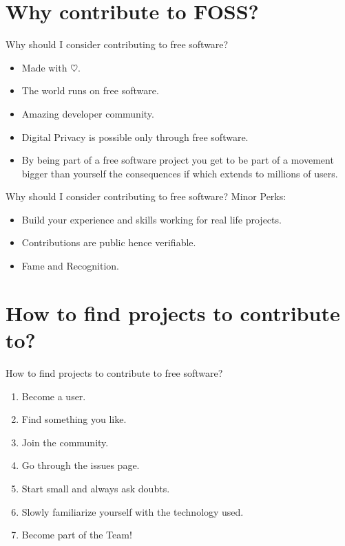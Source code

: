\documentclass[presentation]{beamer}
\begin{document}
\section*{Why contribute to FOSS?}
\label{sec:org112b715}
\begin{frame}[label={sec:orgeff411d}]{Why should I consider contributing to free software?}
\begin{itemize}
\item Made with \alert{\alert{\(\heartsuit\)}}.
\item The world runs on free software.
\item Amazing developer community.
\item Digital Privacy is possible only through free software.
\item By being part of a free software project you get to be part of a movement
bigger than yourself the consequences if which extends to millions of users.
\end{itemize}
\end{frame}

\begin{frame}[label={sec:org58afb19}]{Why should I consider contributing to free software?}
Minor Perks:
\begin{itemize}
\item Build your experience and skills working for real life projects.
\item Contributions are public hence verifiable.
\item Fame and Recognition.
\end{itemize}
\end{frame}
\section*{How to find projects to contribute to?}
\label{sec:orgcb98c90}
\begin{frame}[label={sec:orga67829a}]{How to find projects to contribute to free software?}
\begin{enumerate}
\item Become a user.
\item Find something you like.
\item Join the community.
\item Go through the issues page.
\item Start small and always ask doubts.
\item Slowly familiarize yourself with the technology used.
\item Become part of the Team!
\end{enumerate}
\end{frame}
\end{document}

